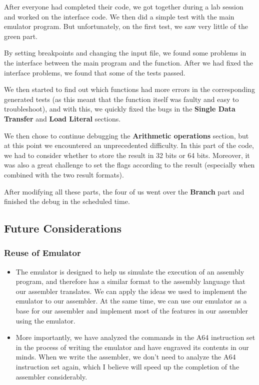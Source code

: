 \documentclass[11pt]{article}
\begin{document}
After everyone had completed their code, we got together during a lab session and worked on the interface code. We then did a simple test with the main emulator program. But unfortunately, on the first test, we saw very little of the green part.

By setting breakpoints and changing the input file, we found some problems in the interface between the main program and the function. After we had fixed the interface problems, we found that some of the tests passed.

We then started to find out which functions had more errors in the corresponding generated tests (as this meant that the function itself was faulty and easy to troubleshoot), and with this, we quickly fixed the bugs in the \textbf{Single Data Transfer} and \textbf{Load Literal} sections.

We then chose to continue debugging the \textbf{Arithmetic operations} section, but at this point we encountered an unprecedented difficulty. In this part of the code, we had to consider whether to store the result in 32 bits or 64 bits. Moreover, it was also a great challenge to set the flags according to the result (especially when combined with the two result formats).

After modifying all these parts, the four of us went over the \textbf{Branch} part and finished the debug in the scheduled time.

\subsection*{Future Considerations}

\subsubsection*{Reuse of Emulator}

\begin{itemize}
  \item The emulator is designed to help us simulate the execution of an assembly program, and therefore has a similar format to the assembly language that our assembler translates. We can apply the ideas we used to implement the emulator to our assembler. At the same time, we can use our emulator as a base for our assembler and implement most of the features in our assembler using the emulator.
  \item More importantly, we have analyzed the commands in the A64 instruction set in the process of writing the emulator and have engraved its contents in our minds. When we write the assembler, we don't need to analyze the A64 instruction set again, which I believe will speed up the completion of the assembler considerably.
\end{itemize}
\end{document}
